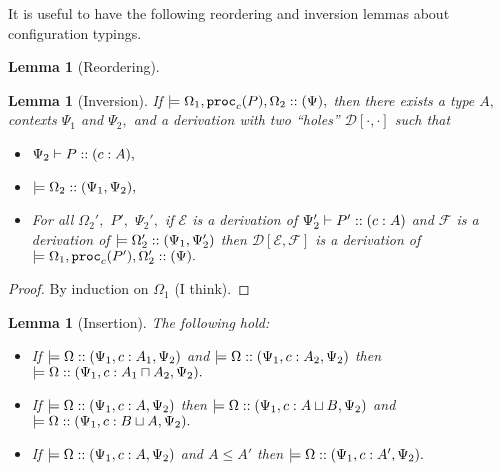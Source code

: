 \documentclass[11pt]{article}
\theoremstyle{plain}
\newtheorem{lemma}[theorem]{Lemma}
\theoremstyle{definition}
\theoremstyle{remark}
\DeclarePairedDelimiter\parens{(}{)}             %
\newcommand{\DD}{\mathcal{D}}
\newcommand{\EE}{\mathcal{E}}
\newcommand{\FF}{\mathcal{F}}
\newcommand\sub{\le}
\newcommand\intersect{\mathbin{\sqcap}}
\newcommand\union{\mathbin{\sqcup}}
\newcommand\irb[1]{\texttt{#1}}
\newcommand{\ctx}{\Psi}
\newcommand{\config}{\Omega}
\newcommand\typeProc[3]{#1 :: \parens{#2 : #3}}
\newcommand\typeS[4]{#1 \vdash \typeProc{#2}{#3}{#4}}
\newcommand\proc[2]{\irb{proc}_{#1}\parens{#2}}
\newcommand\provides[2]{\models #1 :: \parens{#2}}
\begin{document}

It is useful to have the following reordering and inversion lemmas about configuration typings.

\begin{lemma}[Reordering]
  \label{config-reorder}
\end{lemma}

\begin{lemma}[Inversion]
  \label{config-invert}
  If $\provides{\Omega_1, \proc c P, \Omega_2}{\ctx},$ then there exists a type $A,$ contexts $\ctx_1$ and $\ctx_2,$ and a derivation with two ``holes'' $\DD[\cdot, \cdot]$ such that
  \begin{itemize}
    \item $\typeS{\ctx_2}{P}{c}{A},$
    \item $\provides{\Omega_2}{\ctx_1, \ctx_2},$
    \item For all $\Omega_2',$ $P',$ $\ctx_2',$ if $\EE$ is a derivation of $\typeS{\ctx_2'}{P'}{c}{A}$ and $\FF$ is a derivation of $\provides{\Omega_2'}{\ctx_1, \ctx_2'}$ then $\DD[\EE, \FF]$ is a derivation of $\provides{\Omega_1, \proc{c}{P'}, \Omega_2'}{\ctx}.$
  \end{itemize}
\end{lemma}
\begin{proof}
By induction on $\config_1$ (I think).
\end{proof}

\begin{lemma}[Insertion]
  \label{config-insert}
  The following hold:
  \begin{itemize}
    \item If $\provides{\config}{\ctx_1, c : A_1, \ctx_2}$ and $\provides{\config}{\ctx_1, c : A_2, \ctx_2}$ then $\provides{\config}{\ctx_1, c : A_1 \intersect A_2, \ctx_2}.$
    \item If $\provides{\config}{\ctx_1, c : A, \ctx_2}$ then $\provides{\config}{\ctx_1, c : A \union B, \ctx_2}$ and $\provides{\config}{\ctx_1, c : B \union A, \ctx_2}.$
    \item If $\provides{\config}{\ctx_1, c : A, \ctx_2}$ and $A \sub A'$ then $\provides{\config}{\ctx_1, c : A', \ctx_2}.$
  \end{itemize}

\end{lemma}
\end{document}
